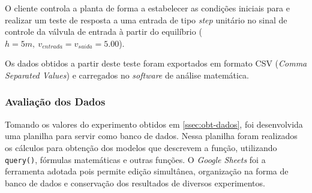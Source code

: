 \documentclass[
	article,			%
	11pt,				%
	oneside,			%
	a4paper,			%
	section=TITLE,		%
	english,			%
	brazil,				%
	sumario=tradicional
	]{abntex2}
\begin{document}
O cliente controla a planta de forma a estabelecer as condições iniciais para e realizar um teste de resposta a uma entrada de tipo \textit{step} unitário no sinal de controle da válvula de entrada à partir do equilíbrio ($h = 5m,~ v_{entrada}=v_{saida}=5.00$).

Os dados obtidos a partir deste teste foram exportados em formato CSV (\textit{Comma Separated Values}) e carregados no \textit{software} de análise matemática.

\subsubsection{Avaliação dos Dados}

Tomando os valores do experimento obtidos em \ref{ssec:obt-dados}, foi desenvolvida uma planilha para servir como banco de dados. Nessa planilha foram realizados os cálculos para obtenção dos modelos que descrevem a função, utilizando \texttt{query()},  fórmulas matemáticas e outras funções. O \textit{Google Sheets} foi a ferramenta adotada pois permite edição simultânea, organização na forma de banco de dados e conservação dos resultados de diversos experimentos. 
\end{document}
